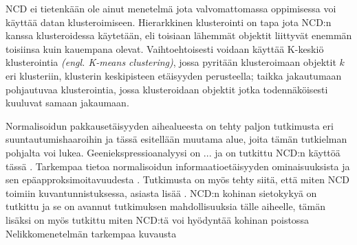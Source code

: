 \documentclass[12pt,finnish]{tktltiki2}
\theoremstyle{definition}
\theoremstyle{remark}
\newcommand{\engl}[1]{\emph{(engl. #1)}}
\begin{document}
  NCD ei tietenkään ole ainut menetelmä jota valvomattomassa oppimisessa voi käyttää datan klusteroimiseen.
  Hierarkkinen klusterointi on tapa jota NCD:n kanssa klusteroidessa käytetään, eli toisiaan lähemmät objektit liittyvät enemmän toisiinsa kuin kauempana olevat. Vaihtoehtoisesti voidaan käyttää K-keskiö klusterointia \engl{K-means clustering}, jossa pyritään klusteroimaan objektit $k$ eri klusteriin, klusterin keskipisteen etäisyyden perusteella; taikka jakautumaan pohjautuvaa klusterointia, jossa klusteroidaan objektit jotka todennäköisesti kuuluvat samaan jakaumaan.

  Normalisoidun pakkausetäisyyden aihealueesta on tehty paljon tutkimusta eri suuntautumishaaroihin ja tässä esitellään muutama alue, joita tämän tutkielman pohjalta voi lukea.
  Geeniekspressioanalyysi on ... ja on tutkittu NCD:n käyttöä tässä \cite{nykter2005normalized}.
  Tarkempaa tietoa normalisoidun informaatioetäisyyden ominaisuuksista ja sen epäapproksimoitavuudesta \cite{terwijn2011nonapproximability}.
  Tutkimusta on myös tehty siitä, että miten NCD toimiin kuvantunnistuksessa, asiasta lisää \cite{doi:10.1117/12.704334}.
  NCD:n kohinan sietokykyä on tutkittu ja se on avannut tutkimuksen mahdollisuuksia tälle aiheelle, tämän lisäksi on myös tutkittu miten NCD:tä voi hyödyntää kohinan poistossa \cite{vitanyi2013similarity}
  Nelikkomenetelmän tarkempaa kuvausta \cite{DBLP:journals/corr/abs-cs-0606048}


%
%

%

% 





%
\end{document}
